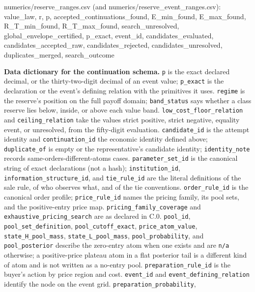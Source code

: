 \documentclass[
  11pt,
]{article}
\newenvironment{Shaded}{}{}
\newcommand{\NormalTok}[1]{#1}
\begin{document}
\begin{Shaded}
\begin{Highlighting}[]
\NormalTok{numerics/reserve\_ranges.csv (and numerics/reserve\_event\_ranges.csv):}
\NormalTok{value\_law, r, p, accepted\_continuations\_found,}
\NormalTok{E\_min\_found, E\_max\_found, R\_T\_min\_found, R\_T\_max\_found,}
\NormalTok{search\_unresolved, global\_envelope\_certified,}
\NormalTok{p\_exact, event\_id, candidates\_evaluated, candidates\_accepted\_raw,}
\NormalTok{candidates\_rejected, candidates\_unresolved, duplicates\_merged, search\_outcome}
\end{Highlighting}
\end{Shaded}

\textbf{Data dictionary for the continuation schema.} \texttt{p} is the
exact declared decimal, or the thirty-two-digit decimal of an event
value; \texttt{p\_exact} is the declaration or the event's defining
relation with the primitives it uses. \texttt{regime} is the reserve's
position on the full payoff domain; \texttt{band\_status} says whether a
class reserve lies below, inside, or above each value band.
\texttt{low\_cost\_floor\_relation} and \texttt{ceiling\_relation} take
the values strict positive, strict negative, equality event, or
unresolved, from the fifty-digit evaluation. \texttt{candidate\_id} is
the attempt identity and \texttt{continuation\_id} the economic identity
defined above; \texttt{duplicate\_of} is empty or the representative's
candidate identity; \texttt{identity\_note} records
same-orders-different-atoms cases. \texttt{parameter\_set\_id} is the
canonical string of exact declarations (not a hash);
\texttt{institution\_id}, \texttt{information\_structure\_id}, and
\texttt{tie\_rule\_id} are the literal definitions of the sale rule, of
who observes what, and of the tie conventions. \texttt{order\_rule\_id}
is the canonical order profile; \texttt{price\_rule\_id} names the
pricing family, its pool sets, and the positive-entry price map.
\texttt{pricing\_family\_coverage} and
\texttt{exhaustive\_pricing\_search} are as declared in C.0.
\texttt{pool\_id}, \texttt{pool\_set\_definition},
\texttt{pool\_cutoff\_exact}, \texttt{price\_atom\_value},
\texttt{state\_H\_pool\_mass}, \texttt{state\_L\_pool\_mass},
\texttt{pool\_probability}, and \texttt{pool\_posterior} describe the
zero-entry atom when one exists and are \texttt{n/a} otherwise; a
positive-price plateau atom in a flat posterior tail is a different kind
of atom and is not written as a no-entry pool.
\texttt{preparation\_rule\_id} is the buyer's action by price region and
cost. \texttt{event\_id} and \texttt{event\_defining\_relation} identify
the node on the event grid. \texttt{preparation\_probability},
\end{document}
